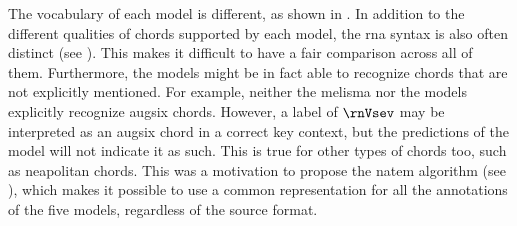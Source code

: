
The vocabulary of each model is different, as shown in
. In addition to the different
qualities of chords supported by each model, the \gls{rna}
syntax is also often distinct (see
). This
makes it difficult to have a fair comparison across all of
them. Furthermore, the models might be in fact able to
recognize chords that are not explicitly mentioned. For
example, neither the \gls{melisma} nor the
\textcite{mcleod2021modular} models explicitly recognize
\gls{augsix} chords. However, a label of $\rnVsev$ may be
interpreted as an \gls{augsix} chord in a correct key
context, but the predictions of the model will not indicate
it as such. This is true for other types of chords too, such
as \gls{neapolitan} chords. This was a motivation to propose
the \gls{natem} algorithm (see
), which
makes it possible to use a common representation for all the
annotations of the five models, regardless of the source
format. 


